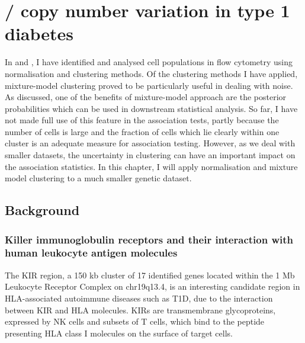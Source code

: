 %

\chapter[KIR3DL1/KIR3DS1 copy number variation in type 1 diabetes]{ \label{chapter:kir} \protect{}/\protect{} copy number variation in type 1 diabetes }


In  and , I have identified and analysed cell populations in flow cytometry using normalisation and clustering methods.
Of the clustering methods I have applied, mixture-model clustering proved to be particularly useful in dealing with noise.
As discussed, one of the benefits of mixture-model approach are the posterior probabilities which can be used in downstream statistical analysis.
So far, I have not made full use of this feature in the association tests, partly because the number of cells is large
and the fraction of cells which lie clearly within one cluster is an adequate measure for association testing.
However, as we deal with smaller datasets, the uncertainty in clustering can have an important impact on the association statistics.
In this chapter, I will apply normalisation and mixture model clustering to a much smaller genetic dataset.


\section{Background}

\subsection{Killer immunoglobulin receptors and their interaction with human leukocyte antigen molecules}

The \gls{KIR} region, a 150 kb cluster of 17 identified genes located within the 1 Mb Leukocyte Receptor Complex on chr19q13.4,
is an interesting candidate region in HLA-associated autoimmune diseases such as \gls{T1D}, due to the interaction between \gls{KIR} and \gls{HLA} molecules.
\Glspl{KIR} are transmembrane glycoproteins, expressed by \gls{NK} cells and subsets of T cells,
which bind to the peptide presenting HLA class I molecules on the surface of target cells.

